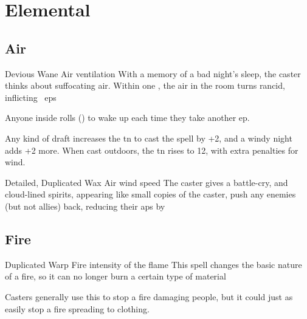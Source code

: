 \section{Elemental }

\begin{multicols}{2}

\subsection{Air}
\label{airSpells}

\setcounter{diceNo}{1}%



  {Devious}%
  {Wane}%
  {Air}%
  {ventilation}%
  {With a memory of a bad night's sleep, the caster thinks about suffocating air.
  Within one \showOnset, the air in the room turns rancid, inflicting ~\glspl{ep}}%
  {Anyone inside rolls  (\tn[10]) to wake up each time they take another \gls{ep}.

  Any kind of draft increases the \gls{tn} to cast the spell by +2, and a windy night adds +2 more.
  When cast outdoors, the \gls{tn} rises to 12, with extra penalties for wind.}

\label{ManaVoidSpell}


  {Detailed, Duplicated}%
  {Wax}%
  {Air}%
  {wind speed}%
  {The caster gives a battle-cry, and cloud-lined spirits, appearing like small copies of the caster, push any enemies (but not allies) back, reducing their \glspl{ap} by }%
  {}



\subsection{Fire}
\label{fireSpells}



  {Duplicated}%
  {Warp}%
  {Fire}%
  {intensity of the flame}%
  {This spell changes the basic nature of a fire, so it can no longer burn a certain type of material}%
  {Casters generally use this to stop a fire damaging people, but it could just as easily stop a fire spreading to clothing.

}
\end{multicols}
